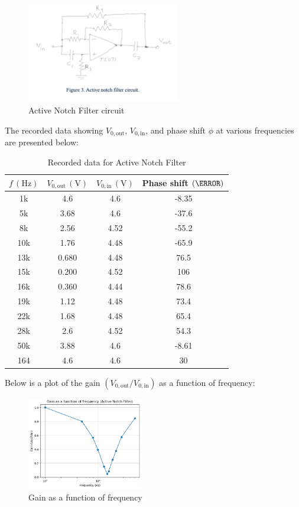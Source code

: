 \documentclass{article}
\begin{document}
\begin{figure}[H]
    \centering
    \includegraphics[width=0.6\textwidth]{img/Lab 9/1_7.png} %
    \caption{Active Notch Filter circuit}
\end{figure}

The recorded data showing \( V_{0,\text{out}} \), \( V_{0,\text{in}} \), 
and phase shift \( \phi \) at various frequencies are presented below:

\begin{table}[H]
\centering
\begin{tabular}{|c|c|c|c|}
\hline
\( f \, (\text{Hz}) \) & \( V_{0,\text{out}} \, (\text{V}) \) & \( V_{0,\text{in}} \, (\text{V}) \) & Phase shift \( (\degree) \) \\
\hline
1k   & 4.6   & 4.6  & -8.35  \\
5k   & 3.68  & 4.6  & -37.6  \\
8k   & 2.56  & 4.52 & -55.2  \\
10k  & 1.76  & 4.48 & -65.9  \\
13k  & 0.680 & 4.48 & 76.5   \\
15k  & 0.200 & 4.52 & 106    \\
16k  & 0.360 & 4.44 & 78.6   \\
19k  & 1.12  & 4.48 & 73.4   \\
22k  & 1.68  & 4.48 & 65.4   \\
28k  & 2.6   & 4.52 & 54.3   \\
50k  & 3.88  & 4.6  & -8.61  \\
164  & 4.6   & 4.6  & 30     \\
\hline
\end{tabular}
\caption{Recorded data for Active Notch Filter}
\end{table}

Below is a plot of the gain \( (V_{0,\text{out}}/V_{0,\text{in}}) \) 
as a function of frequency:

\begin{figure}[H]
    \centering
    \includegraphics[width=0.45\textwidth]{img/Lab 9/1_4.png} %
    \caption{Gain as a function of frequency}
\end{figure}
\end{document}
